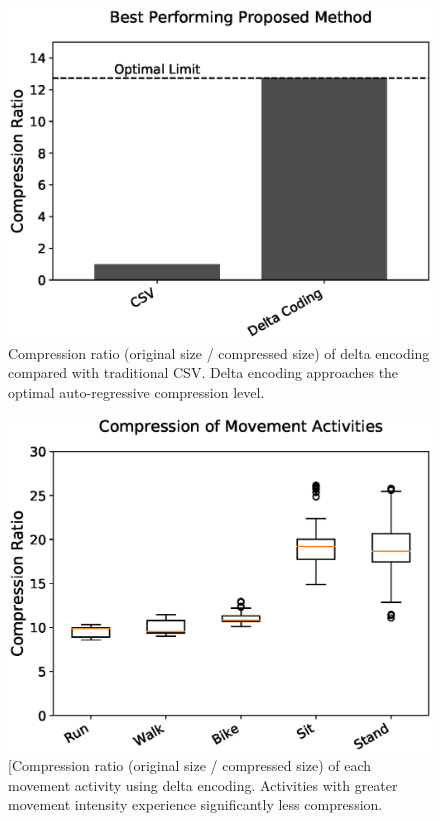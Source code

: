 \documentclass[journal]{IEEEtran}
\begin{document}
\begin{figure}

  \includegraphics[width=\linewidth]{diff.eps}
  \caption{Compression ratio (original size / compressed size) of delta encoding compared with traditional CSV. Delta encoding approaches the optimal auto-regressive compression level.}
  \label{fig:main_results}
  
\end{figure}
\begin{figure}

  \includegraphics[width=\linewidth]{movement.eps}
  \caption{[Compression ratio (original size / compressed size) of each movement activity using delta encoding. Activities with greater movement intensity experience significantly less compression.}
  \label{fig:movements}
  
\end{figure}
\end{document}
